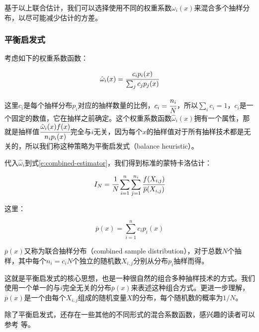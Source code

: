 基于以上联合估计，我们可以选择使用不同的权重系数$\omega_i(x)$来混合多个抽样分布，以尽可能减少估计的方差。




\subsubsection{平衡启发式}\label{sec:mc-balance-heuristic}
考虑如下的权重系数函数：

\begin{equation}
	\hat{\omega}_i(x)= \cfrac{c_ip_i(x)}{\sum_j c_jp_j(x)}
\end{equation}

\noindent 这里$c_i$是每个抽样分布$p_i$对应的抽样数量的比例，$c_i= \cfrac{n_i}{N}$，所以$\sum_i c_i=1$，$c_i$是一个固定的数值，它在抽样之前确定。这个权重系数函数$\hat{\omega}_i(x)$拥有一个属性，那就是抽样值$ \cfrac{\hat{\omega}_i(x)f(x)}{n_ip_i(x)}$完全与$i$无关，因为每个$x$的抽样值对于所有抽样技术都是无关的，所以我们称这种策略为平衡启发式（balance heuristic）。

代入$\hat{\omega}_i$到式\ref{e:combined-estimator}，我们得到标准的蒙特卡洛估计：

\begin{equation}
	I_N= \cfrac{1}{N}\sum_{i=1}^{n}\sum_{j=1}^{n_i} \cfrac{f(X_{i,j})}{\overline{p}(X_{i,j})}
\end{equation} 

\noindent 这里：

\begin{equation}
	\overline{p}(x)=\sum_{i=1}^{n}c_ip_i(x)
\end{equation}

$\overline{p}(x)$又称为联合抽样分布（combined sample distribution），对于总数$N$个抽样，其中每个$n_i=c_i N$个独立的随机数$X_{i,j}$分别从分布$p_i$抽样而得。

这就是平衡启发式的核心思想，也是一种很自然的组合多种抽样技术的方式。我们使用一个单一的与$i$完全无关的分布$\overline{p}(x)$来表述这种组合方式。更进一步理解，$\overline{p}(x)$是一个由每个$X_{i,j}$组成的随机变量$X$的分布，每个随机数的概率为$1/N$。

除了平衡启发式，还存在一些其他的不同形式的混合系数函数，感兴趣的读者可以参考 \cite{a:Safeandeffectiveimportancesampling,a:AdaptiveMultipleImportanceSampling,a:ANADAPTIVEPOPULATIONIMPORTANCESAMPLER,a:EfficientMultipleImportanceSamplingEstimators}等。





